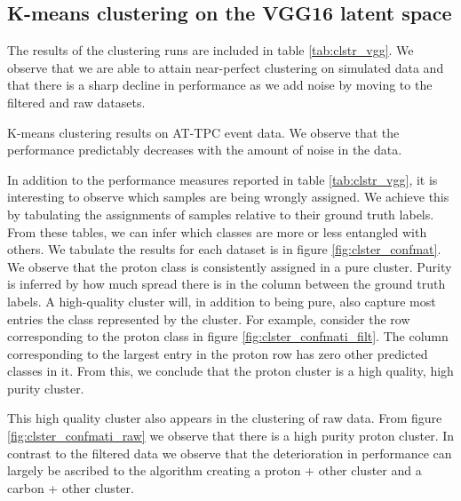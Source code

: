 \documentclass[review,number,sort&compress]{elsarticle}
\begin{document}
\subsection{K-means clustering on the VGG16 latent space}

The results of the clustering runs are included in table \ref{tab:clstr_vgg}. We observe that we are able to attain near-perfect clustering on simulated data and that there is a sharp decline in performance as we add noise by moving to the filtered and raw datasets. 


\begin{table}[H]
\centering 
\caption[K-means on pre-trained model]{K-means clustering results on AT-TPC event data. We observe that the performance predictably decreases with the amount of noise in the data.}\label{tab:clstr_vgg}

\end{table}

In addition to the performance measures reported in table \ref{tab:clstr_vgg}, it is interesting to observe which samples are being wrongly assigned. We achieve this by tabulating the assignments of samples relative to their ground truth labels. From these tables, we can infer which classes are more or less entangled with others. We tabulate the results for each dataset is in figure \ref{fig:clster_confmat}. We observe that the proton class is consistently assigned in a pure cluster. Purity is inferred by how much spread there is in the column between the ground truth labels. A high-quality cluster will, in addition to being pure, also capture most entries the class represented by the cluster. For example, consider the row corresponding to the proton class in figure \ref{fig:clster_confmati_filt}. The column corresponding to the largest entry in the proton row has zero other predicted classes in it. From this, we conclude that the proton cluster is a high quality, high purity cluster. 

This high quality cluster also appears in the clustering of raw data. From figure \ref{fig:clster_confmati_raw} we observe that there is a high purity proton cluster. In contrast to the filtered data we observe that the deterioration in performance can largely be ascribed to the algorithm creating a proton + other cluster and a carbon + other cluster.
\end{document}
